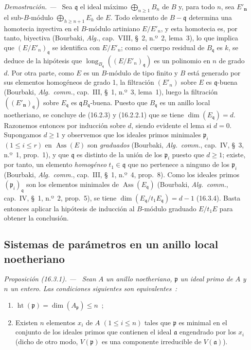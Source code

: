 \documentclass[10pt,oneside]{book}
\makeatletter
\newcommand{\setmanualcurrentlabel}[1]{\def\@currentlabel{#1}}
\newenvironment{proposition}[1][]{%
  \setmanualcurrentlabel{#1}\par\medskip\noindent\itshape Proposición (#1). ---\ }{\par}
\newenvironment{proof}{%
  \par\medskip\noindent\textit{Demostración. ---\ }}{\par}
\providecommand{\setmin}{-}%
\makeatother
\begin{document}
\begin{proof}
Sea $\mathfrak{q}$ el ideal máximo $\bigoplus_{n\geq1}B_n$ de $B$ y, para todo
$n$, sea $E'_{\boldsymbol n}$ el sub-$B$-módulo $\bigoplus_{h\geq n+1}E_h$ de $E$. Todo
elemento de $B\setmin\mathfrak{q}$ determina una homotecia inyectiva en el
$B$-módulo artiniano $E/E'_n$, y esta homotecia es, por tanto, biyectiva
(Bourbaki, \emph{Alg.}, cap.~VIII, \S~2, n.º~2, lema~3), lo que implica que
$(E/E'_n)_{\mathfrak{q}}$ se identifica con $E/E'_n$; como el cuerpo residual
de $B_{\mathfrak{q}}$ es $k$, se deduce de la hipótesis que
$\operatorname{long}_{B_{\mathfrak{q}}}((E/E'_n)_{\mathfrak{q}})$ es un
polinomio en $n$ de grado $d$. Por otra parte, como $E$ es un $B$-módulo de
tipo finito y $B$ está generado por sus elementos homogéneos de grado 1, la
filtración $(E'_n)$ sobre $E$ es $\mathfrak{q}$-buena (Bourbaki,
\emph{Alg.~comm.}, cap.~III, \S~1, n.º~3, lema~1), luego la filtración
$((E'_{\boldsymbol n})_{\mathfrak{q}})$ sobre $E_{\mathfrak{q}}$ es
$\mathfrak{q}B_{\mathfrak{q}}$-buena. Puesto que $B_{\mathfrak{q}}$ es un
anillo local noetheriano, se concluye de (16.2.3) y (16.2.2.1) que se tiene
$\dim(E_{\mathfrak{q}})=d$. Razonemos entonces por inducción sobre $d$, siendo
evidente el lema si $d=0$. Supongamos $d\geq1$ y observemos que los ideales
primos minimales $\mathfrak{p}_i$ $(1\leq i\leq r)$ en
$\operatorname{Ass}(E)$ son \emph{graduados} (Bourbaki, \emph{Alg.~comm.},
cap.~IV, \S~3, n.º~1, prop.~1), y que $\mathfrak{q}$ es distinto de la unión
de los $\mathfrak{p}_i$ puesto que $d\geq1$; existe, por tanto, un elemento
\emph{homogéneo} $t_1\in\mathfrak{q}$ que no pertenece a ninguno de los
$\mathfrak{p}_i$ (Bourbaki, \emph{Alg.~comm.}, cap.~III, \S~1, n.º~4,
prop.~8). Como los ideales primos $(\mathfrak{p}_i)_{\mathfrak{q}}$ son los
elementos minimales de $\operatorname{Ass}(E_{\mathfrak{q}})$ (Bourbaki,
\emph{Alg.~comm.}, cap.~IV, \S~1, n.º~2, prop.~5), se tiene
$\dim(E_{\mathfrak{q}}/t_1E_{\mathfrak{q}})=d\setmin 1$ (16.3.4). Basta entonces
aplicar la hipótesis de inducción al $B$-módulo graduado $E/t_1E$ para obtener
la conclusión.
\end{proof}
\subsection{Sistemas de parámetros en un anillo local noetheriano}
\label{subsection:0.16.3-es}

\begin{proposition}[16.3.1]
\label{0.16.3.1-es}
Sean $A$ un anillo noetheriano, $\mathfrak{p}$ un ideal primo de $A$ y $n$ un
entero. Las condiciones siguientes son equivalentes~:
\begin{enumerate}
  \item[\textup{a)}] $\operatorname{ht}(\mathfrak{p})=
  \dim(A_{\mathfrak{p}})\leq n$~;
  \item[\textup{b)}] Existen $n$ elementos $x_i$ de $A$ $(1\leq i\leq n)$ tales que
  $\mathfrak{p}$ es minimal en el conjunto de los ideales primos que contienen
  el ideal $\mathfrak{a}$ engendrado por los $x_i$ \textup{(dicho de otro modo,}
  $V(\mathfrak{p})$ es una componente irreducible de $V(\mathfrak{a})$).
\end{enumerate}
\end{proposition}
\end{document}
